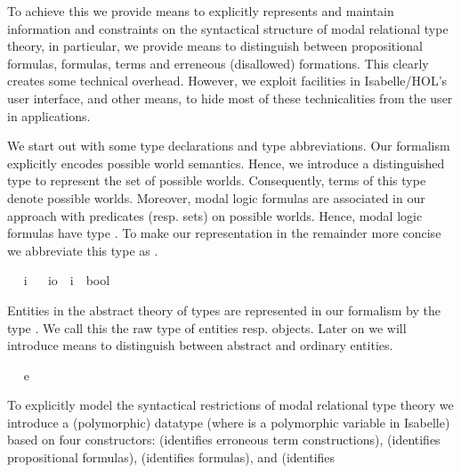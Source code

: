 \begin{isabellebody}
\begin{isamarkuptext}
  To achieve this  we provide means to explicitly represents and maintain information and constraints on the 
  syntactical structure of modal relational type theory, in particular, we provide means to distinguish 
  between propositional formulas, formulas, terms and erreneous (disallowed) formations. 
  This clearly creates some technical overhead. However, we exploit facilities in Isabelle/HOL's user 
  interface, and other means, to hide most of these technicalities from the user in applications.%
\end{isamarkuptext}%
\isamarkuptrue%
%
\isamarkuptrue%
%
\begin{isamarkuptext}%
We start out with some type declarations and type abbreviations. 
  Our formalism explicitly encodes possible world semantics. Hence, we introduce a 
  distinguished type  to represent the set of possible worlds. 
  Consequently, terms of this type denote possible worlds. 
  Moreover, modal logic formulas are associated in our approach with
  predicates (resp. sets) on possible worlds. Hence, modal logic formulas have
  type . To make our representation in the remainder more concise
  we abbreviate this type as .%
\end{isamarkuptext}%
\isamarkuptrue%
\ \isamarkupfalse%
\ i\isanewline
\ \isamarkupfalse%
\ io\ {\isacharequal}\ {\isachardoublequoteopen}{\isacharparenleft}i\ {\isasymRightarrow}\ bool{\isacharparenright}{\isachardoublequoteclose}%
\begin{isamarkuptext}%
Entities in the abstract theory of types are represented in our formalism by the
  type . We call this the raw type of entities resp. objects. Later 
  on we will introduce means to distinguish between abstract and ordinary entities.%
\end{isamarkuptext}%
\isamarkuptrue%
\ \isamarkupfalse%
\ e%
\begin{isamarkuptext}%
To explicitly model the syntactical restrictions of modal relational type theory we introduce a 
  (polymorphic) datatype  (where  is a polymorphic variable in Isabelle) 
  based on four constructors:  (identifies erroneous term constructions),  
  (identifies propositional formulas),  (identifies  formulas), and  (identifies 

\end{isamarkuptext}
\end{isabellebody}
